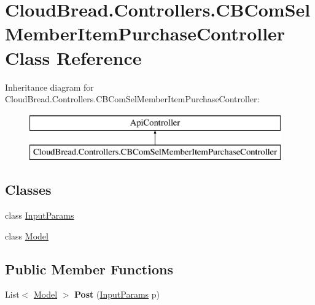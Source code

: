 \hypertarget{class_cloud_bread_1_1_controllers_1_1_c_b_com_sel_member_item_purchase_controller}{}\section{Cloud\+Bread.\+Controllers.\+C\+B\+Com\+Sel\+Member\+Item\+Purchase\+Controller Class Reference}
\label{class_cloud_bread_1_1_controllers_1_1_c_b_com_sel_member_item_purchase_controller}
Inheritance diagram for Cloud\+Bread.\+Controllers.\+C\+B\+Com\+Sel\+Member\+Item\+Purchase\+Controller\+:\begin{figure}[H]
\begin{center}
\leavevmode
\includegraphics[height=2.000000cm]{class_cloud_bread_1_1_controllers_1_1_c_b_com_sel_member_item_purchase_controller}
\end{center}
\end{figure}
\subsection*{Classes}
\begin{DoxyCompactItemize}
\item 
class \hyperlink{class_cloud_bread_1_1_controllers_1_1_c_b_com_sel_member_item_purchase_controller_1_1_input_params}{Input\+Params}
\item 
class \hyperlink{class_cloud_bread_1_1_controllers_1_1_c_b_com_sel_member_item_purchase_controller_1_1_model}{Model}
\end{DoxyCompactItemize}
\subsection*{Public Member Functions}
\begin{DoxyCompactItemize}
\item 
List$<$ \hyperlink{class_cloud_bread_1_1_controllers_1_1_c_b_com_sel_member_item_purchase_controller_1_1_model}{Model} $>$ {\bfseries Post} (\hyperlink{class_cloud_bread_1_1_controllers_1_1_c_b_com_sel_member_item_purchase_controller_1_1_input_params}{Input\+Params} p)\hypertarget{class_cloud_bread_1_1_controllers_1_1_c_b_com_sel_member_item_purchase_controller_a465f776801d7078ce72ee87ebb05992b}{}\label{class_cloud_bread_1_1_controllers_1_1_c_b_com_sel_member_item_purchase_controller_a465f776801d7078ce72ee87ebb05992b}

\end{DoxyCompactItemize}


